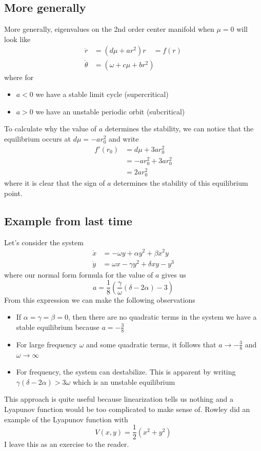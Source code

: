 \documentclass{article}
\begin{document}
\subsection{More generally}

More generally, eigenvalues on the 2nd order center manifold when $\mu=0$ will look like 
\begin{align*}
    \dot{r}&= \left(d\mu + a r^2\right)r \quad = f(r)\\
    \dot{\theta} &= \left(\omega + c \mu + br^2\right)
\end{align*}
where for 
\begin{itemize}
    \item $a<0$ we have a stable limit cycle (supercritical)
    \item $a>0$ we have an unstable periodic orbit (subcritical)
\end{itemize}
To calculate why the value of $a$ determines the stability, we can notice that the equilibrium occurs at $d\mu = -ar_0^2$ and write 
\begin{align*}
    f'(r_0)&= d\mu + 3ar_0^2\\
    &= -ar_0^2 + 3ar_0^2\\
    &= 2ar_0^2
\end{align*}
where it is clear that the sign of $a$ determines the stability of this equilibrium point.

\subsection{Example from last time}

Let's consider the system 
\begin{align*}
    \dot{x}&= -\omega y + \alpha y^2 + \beta x^2 y \\
    \dot{y}&= \omega x - \gamma y^2 + \delta xy - y^3
\end{align*}
where our normal form formula for the value of $a$ gives us 
\[
a=\frac{1}{8}\left(\frac{\gamma}{\omega}\left(\delta - 2\alpha\right)-3\right)
\]
From this expression we can make the following observations
\begin{itemize}
    \item If $\alpha=\gamma=\beta=0$, then there are no quadratic terms in the system we have a stable equilibrium because $a=-\frac{3}{8}$
    \item For large frequency $\omega$ and some quadratic terms, it follows that $a\to -\frac{3}{8}$ and $\omega\to \infty$
    \item For frequency, the system can destabilize. This is apparent by writing $\gamma\left(\delta - 2\alpha\right)>3\omega$ which is an unstable equilibrium
\end{itemize}
This approach is quite useful because linearization tells us nothing and a Lyapunov function would be too complicated to make sense of. Rowley did an example of the Lyapunov function with 
\[
V(x,y) = \frac{1}{2}\left(x^2 + y^2\right)
\]
I leave this as an exercise to the reader.
\end{document}
